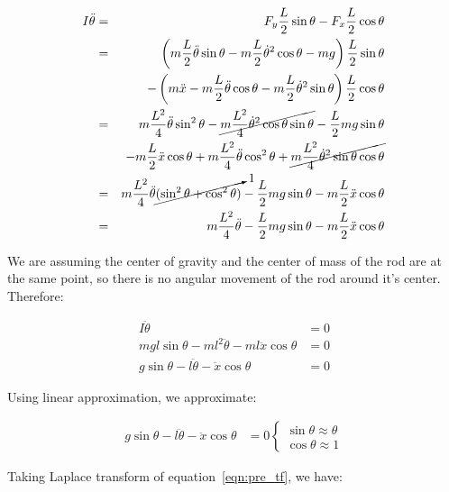 \documentclass{notes}
\begin{document}
 \begin{eqnarray*}
   I\ddot{\theta} & = & F_y\dfrac{L}{2}\sin\theta - F_x\dfrac{L}{2}\cos\theta \\
     & = & \left( m\dfrac{L}{2}\ddot{\theta}\sin\theta - m\dfrac{L}{2}\dot{\theta}^2\cos\theta 
            - mg\right) \dfrac{L}{2}\sin\theta \\
     &   & -\left( m\ddot{x} - m\dfrac{L}{2}\ddot{\theta}\cos\theta - 
             m\dfrac{L}{2}\dot{\theta}^2\sin\theta \right) \dfrac{L}{2}\cos\theta\\
     & = & m\dfrac{L^2}{4}\ddot{\theta}\sin^2\theta 
           - \cancel{m\dfrac{L^2}{4}\dot{\theta}^2\cos\theta\sin\theta} - \dfrac{L}{2}mg\sin\theta\\
     &   & - m \dfrac{L}{2} \ddot{x}\cos\theta + m\dfrac{L^2}{4}\ddot{\theta}\cos^2\theta + 
             \cancel{m\dfrac{L^2}{4}\dot{\theta}^2\sin\theta\cos\theta} \\
     & = & m\dfrac{L^2}{4}\ddot{\theta}\cancelto{1}{(\sin^2\theta + \cos^2\theta)}
           - \dfrac{L}{2}mg\sin\theta - m \dfrac{L}{2}\ddot{x}\cos\theta \\
     & = & m \dfrac{L^2}{4}\ddot{\theta} - \dfrac{L}{2}mg\sin\theta 
           - m \dfrac{L}{2} \ddot{x}\cos\theta
 \end{eqnarray*}

We are assuming the center of gravity and the center of mass of the rod are at the same point, so
there is no angular movement of the rod around it's center. Therefore:

\begin{align}
  I\ddot{\theta} & = 0 \nonumber\\
  mgl\sin\theta - ml^2\ddot{\theta} - ml\ddot{x}\cos\theta  & = 0 \nonumber\\
  g\sin\theta - l\ddot{\theta} - \ddot{x}\cos\theta & = 0 \label{eqn:pre_tf}
\end{align}



Using linear approximation, we approximate:

\begin{align*}
  g\sin\theta - l\ddot{\theta} - \ddot{x}\cos\theta & = 0
  \begin{cases}
    \sin\theta \approx \theta \\
    \cos\theta \approx 1
  \end{cases}
\end{align*}
 
Taking Laplace transform of equation~\ref{eqn:pre_tf}, we have: 
\end{document}
